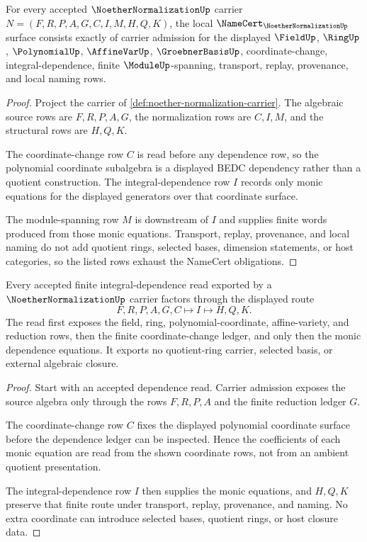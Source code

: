 \begin{theorem}
\label{thm:noether-normalization-namecert-obligations}
For every accepted $\NoetherNormalizationUp$ carrier $N=(F,R,P,A,G,C,I,M,H,Q,K)$, the local $\NameCert_{\NoetherNormalizationUp}$ surface consists exactly of carrier admission for the displayed $\FieldUp$, $\RingUp$, $\PolynomialUp$, $\AffineVarUp$, $\GroebnerBasisUp$, coordinate-change, integral-dependence, finite $\ModuleUp$-spanning, transport, replay, provenance, and local naming rows.
\end{theorem}
\begin{proof}
Project the carrier of \autoref{def:noether-normalization-carrier}. The algebraic source rows are $F,R,P,A,G$, the normalization rows are $C,I,M$, and the structural rows are $H,Q,K$.

The coordinate-change row $C$ is read before any dependence row, so the polynomial coordinate subalgebra is a displayed BEDC dependency rather than a quotient construction. The integral-dependence row $I$ records only monic equations for the displayed generators over that coordinate surface.

The module-spanning row $M$ is downstream of $I$ and supplies finite words produced from those monic equations. Transport, replay, provenance, and local naming do not add quotient rings, selected bases, dimension statements, or host categories, so the listed rows exhaust the NameCert obligations.
\end{proof}

\begin{theorem}
\label{thm:noether-normalization-finite-integral-dependence-route}
Every accepted finite integral-dependence read exported by a $\NoetherNormalizationUp$ carrier factors through the displayed route
$$
F,R,P,A,G,C \longmapsto I \longmapsto H,Q,K .
$$
The read first exposes the field, ring, polynomial-coordinate, affine-variety, and reduction rows, then the finite coordinate-change ledger, and only then the monic dependence equations. It exports no quotient-ring carrier, selected basis, or external algebraic closure.
\end{theorem}
\begin{proof}
Start with an accepted dependence read. Carrier admission exposes the source algebra only through the rows $F,R,P,A$ and the finite reduction ledger $G$.

The coordinate-change row $C$ fixes the displayed polynomial coordinate surface before the dependence ledger can be inspected. Hence the coefficients of each monic equation are read from the shown coordinate rows, not from an ambient quotient presentation.

The integral-dependence row $I$ then supplies the monic equations, and $H,Q,K$ preserve that finite route under transport, replay, provenance, and naming. No extra coordinate can introduce selected bases, quotient rings, or host closure data.
\end{proof}

